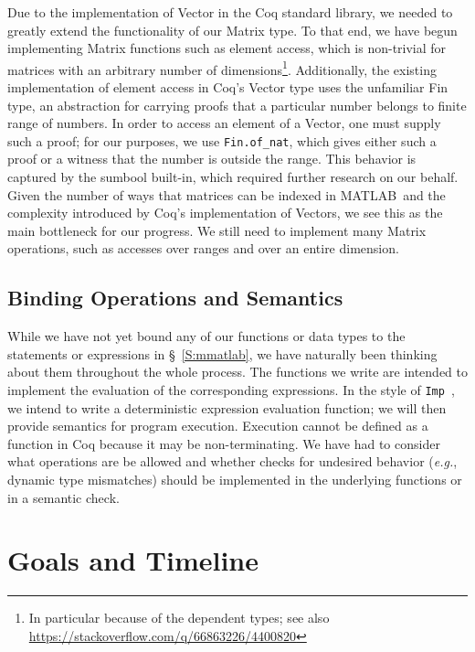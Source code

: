 \documentclass[11pt,conference]{IEEEtran}
\newcommand{\matlab}{MATLAB}
\theoremstyle{plain} %
\theoremstyle{definition}
\theoremstyle{remark}
\begin{document}
Due to the implementation of \textsf{Vector} in the Coq standard library, we
needed to greatly extend the functionality of our \textsf{Matrix} type. To that
end, we have begun implementing \textsf{Matrix} functions such as element
access, which is non-trivial for matrices with an arbitrary number of
dimensions\footnote{In particular because of the dependent types; see also
\url{https://stackoverflow.com/q/66863226/4400820}}. Additionally, the existing
implementation of element access in Coq's \textsf{Vector} type uses the
unfamiliar \textsf{Fin} type, an abstraction for carrying proofs that a
particular number belongs to finite range of numbers. In order to access an
element of a \textsf{Vector}, one must supply such a proof; for our purposes, we
use \texttt{Fin.of\_nat}, which gives either such a proof or a witness that the
number is outside the range. This behavior is captured by the \textsf{sumbool}
built-in, which required further research on our behalf. Given the number of
ways that matrices can be indexed in \matlab\ and the complexity introduced by
Coq's implementation of \textsf{Vector}s, we see this as the main bottleneck for
our progress. We still need to implement many \textsf{Matrix} operations, such
as accesses over ranges and over an entire dimension.

\subsection{Binding Operations and Semantics}

While we have not yet bound any of our functions or data types to the statements
or expressions in \S~\ref{S:mmatlab}, we have naturally been thinking about them
throughout the whole process. The functions we write are intended to implement
the evaluation of the corresponding expressions. In the style of
\texttt{Imp}~\cite{Pierce:SF1}, we intend to write a deterministic expression
evaluation function; we will then provide semantics for program execution.
Execution cannot be defined as a function in Coq because it may be
non-terminating. We have had to consider what operations are be allowed and
whether checks for undesired behavior (\emph{e.g.}, dynamic type mismatches)
should be implemented in the underlying functions or in a semantic check.



\section{Goals and Timeline}
\end{document}
